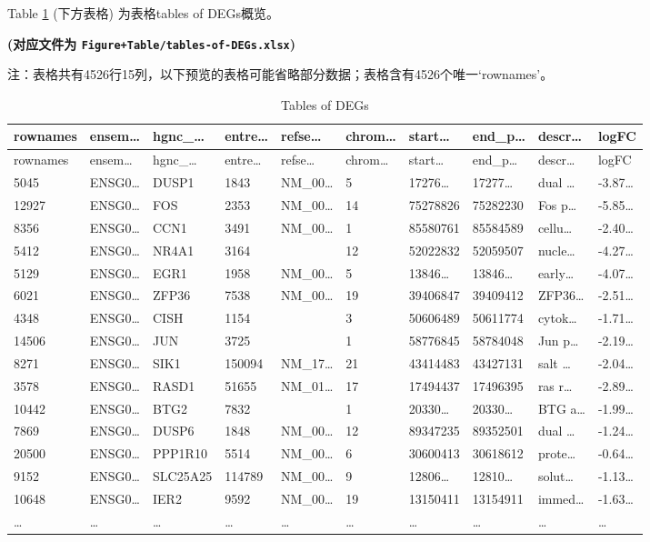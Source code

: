 \documentclass[
]{article}
\begin{document}
Table \ref{tab:tables-of-DEGs} (下方表格) 为表格tables of DEGs概览。

\textbf{(对应文件为 \texttt{Figure+Table/tables-of-DEGs.xlsx})}

\begin{center}\begin{tcolorbox}[colback=gray!10, colframe=gray!50, width=0.9\linewidth, arc=1mm, boxrule=0.5pt]注：表格共有4526行15列，以下预览的表格可能省略部分数据；表格含有4526个唯一`rownames'。
\end{tcolorbox}
\end{center}

\begin{longtable}[]{@{}llllllllll@{}}
\caption{\label{tab:tables-of-DEGs}Tables of DEGs}\tabularnewline
\toprule
rownames & ensem\ldots{} & hgnc\_\ldots{} & entre\ldots{} & refse\ldots{} & chrom\ldots{} & start\ldots{} & end\_p\ldots{} & descr\ldots{} & logFC\tabularnewline
\midrule
\endfirsthead
\toprule
rownames & ensem\ldots{} & hgnc\_\ldots{} & entre\ldots{} & refse\ldots{} & chrom\ldots{} & start\ldots{} & end\_p\ldots{} & descr\ldots{} & logFC\tabularnewline
\midrule
\endhead
5045 & ENSG0\ldots{} & DUSP1 & 1843 & NM\_00\ldots{} & 5 & 17276\ldots{} & 17277\ldots{} & dual \ldots{} & -3.87\ldots{}\tabularnewline
12927 & ENSG0\ldots{} & FOS & 2353 & NM\_00\ldots{} & 14 & 75278826 & 75282230 & Fos p\ldots{} & -5.85\ldots{}\tabularnewline
8356 & ENSG0\ldots{} & CCN1 & 3491 & NM\_00\ldots{} & 1 & 85580761 & 85584589 & cellu\ldots{} & -2.40\ldots{}\tabularnewline
5412 & ENSG0\ldots{} & NR4A1 & 3164 & & 12 & 52022832 & 52059507 & nucle\ldots{} & -4.27\ldots{}\tabularnewline
5129 & ENSG0\ldots{} & EGR1 & 1958 & NM\_00\ldots{} & 5 & 13846\ldots{} & 13846\ldots{} & early\ldots{} & -4.07\ldots{}\tabularnewline
6021 & ENSG0\ldots{} & ZFP36 & 7538 & NM\_00\ldots{} & 19 & 39406847 & 39409412 & ZFP36\ldots{} & -2.51\ldots{}\tabularnewline
4348 & ENSG0\ldots{} & CISH & 1154 & & 3 & 50606489 & 50611774 & cytok\ldots{} & -1.71\ldots{}\tabularnewline
14506 & ENSG0\ldots{} & JUN & 3725 & & 1 & 58776845 & 58784048 & Jun p\ldots{} & -2.19\ldots{}\tabularnewline
8271 & ENSG0\ldots{} & SIK1 & 150094 & NM\_17\ldots{} & 21 & 43414483 & 43427131 & salt \ldots{} & -2.04\ldots{}\tabularnewline
3578 & ENSG0\ldots{} & RASD1 & 51655 & NM\_01\ldots{} & 17 & 17494437 & 17496395 & ras r\ldots{} & -2.89\ldots{}\tabularnewline
10442 & ENSG0\ldots{} & BTG2 & 7832 & & 1 & 20330\ldots{} & 20330\ldots{} & BTG a\ldots{} & -1.99\ldots{}\tabularnewline
7869 & ENSG0\ldots{} & DUSP6 & 1848 & NM\_00\ldots{} & 12 & 89347235 & 89352501 & dual \ldots{} & -1.24\ldots{}\tabularnewline
20500 & ENSG0\ldots{} & PPP1R10 & 5514 & NM\_00\ldots{} & 6 & 30600413 & 30618612 & prote\ldots{} & -0.64\ldots{}\tabularnewline
9152 & ENSG0\ldots{} & SLC25A25 & 114789 & NM\_00\ldots{} & 9 & 12806\ldots{} & 12810\ldots{} & solut\ldots{} & -1.13\ldots{}\tabularnewline
10648 & ENSG0\ldots{} & IER2 & 9592 & NM\_00\ldots{} & 19 & 13150411 & 13154911 & immed\ldots{} & -1.63\ldots{}\tabularnewline
\ldots{} & \ldots{} & \ldots{} & \ldots{} & \ldots{} & \ldots{} & \ldots{} & \ldots{} & \ldots{} & \ldots{}\tabularnewline
\bottomrule
\end{longtable}
\end{document}
